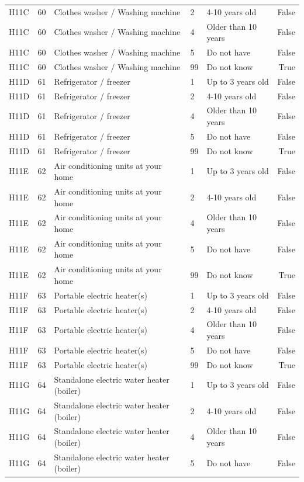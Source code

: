 \begin{tabular}{lrlllr}
H11C & 60 & Clothes washer / Washing machine & 2 & 4-10 years old & False \\
H11C & 60 & Clothes washer / Washing machine & 4 & Older than 10 years & False \\
H11C & 60 & Clothes washer / Washing machine & 5 & Do not have & False \\
H11C & 60 & Clothes washer / Washing machine & 99 & Do not know & True \\
H11D & 61 & Refrigerator / freezer & 1 & Up to 3 years old & False \\
H11D & 61 & Refrigerator / freezer & 2 & 4-10 years old & False \\
H11D & 61 & Refrigerator / freezer & 4 & Older than 10 years & False \\
H11D & 61 & Refrigerator / freezer & 5 & Do not have & False \\
H11D & 61 & Refrigerator / freezer & 99 & Do not know & True \\
H11E & 62 & Air conditioning units at your home & 1 & Up to 3 years old & False \\
H11E & 62 & Air conditioning units at your home & 2 & 4-10 years old & False \\
H11E & 62 & Air conditioning units at your home & 4 & Older than 10 years & False \\
H11E & 62 & Air conditioning units at your home & 5 & Do not have & False \\
H11E & 62 & Air conditioning units at your home & 99 & Do not know & True \\
H11F & 63 & Portable electric heater(s) & 1 & Up to 3 years old & False \\
H11F & 63 & Portable electric heater(s) & 2 & 4-10 years old & False \\
H11F & 63 & Portable electric heater(s) & 4 & Older than 10 years & False \\
H11F & 63 & Portable electric heater(s) & 5 & Do not have & False \\
H11F & 63 & Portable electric heater(s) & 99 & Do not know & True \\
H11G & 64 & Standalone electric water heater (boiler) & 1 & Up to 3 years old & False \\
H11G & 64 & Standalone electric water heater (boiler) & 2 & 4-10 years old & False \\
H11G & 64 & Standalone electric water heater (boiler) & 4 & Older than 10 years & False \\
H11G & 64 & Standalone electric water heater (boiler) & 5 & Do not have & False \\

\end{tabular}
